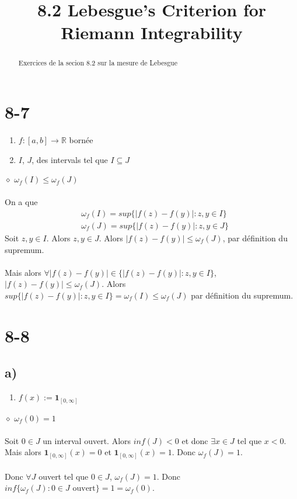 \documentclass[a4paper,10pt]{article}
\title{8.2 Lebesgue's Criterion for Riemann Integrability}
\begin{document}
\maketitle

\begin{abstract}
Exercices de la secion 8.2 sur la mesure de Lebesgue
\end{abstract}

\section*{8-7}
\begin{enumerate}
  \item $f : [a,b] \rightarrow \mathbb{R}$ bornée
  \item $I$, $J$, des intervals tel que $I \subseteq J$
\end{enumerate}
$\diamond$  $\omega_f (I) \leq \omega_f (J)$
\\
\\
On a que
\begin{align*}
  & \omega_f (I) = sup \{|f(z) - f(y)| : z,y \in I\} \\
  & \omega_f (J) = sup \{|f(z) - f(y)| : z,y \in J\}
\end{align*}
Soit $z,y \in I$. Alors $z,y \in J$. Alors $|f(z) - f(y)| \leq \omega_f (J)$, par définition du supremum.
\\
\\
Mais alors $\forall |f(z) - f(y)| \in \{|f(z) - f(y)| : z,y \in I\}$, $|f(z) - f(y)| \leq \omega_f (J)$. Alors 
$sup \{|f(z) - f(y)| : z,y \in I\} = \omega_f (I) \leq \omega_f (J)$ par définition du supremum.

\section*{8-8}
\subsection*{a)}
\begin{enumerate}
 \item $f(x) := \textbf{1}_{[0, \infty]}$
\end{enumerate}
$\diamond$ $\omega_f (0) = 1$
\\
\\
Soit $0 \in J$ un interval ouvert. Alors $inf(J) < 0$ et donc $\exists x \in J$ tel que $x < 0$. Mais alors 
$\textbf{1}_{[0, \infty]} (x) = 0$ et $\textbf{1}_{[0, \infty]} (x) = 1$. Donc $\omega_f (J) = 1$. 
\\
\\
Donc $\forall J$ ouvert tel que $0 \in J$, $\omega_f (J) = 1$. Donc $inf \{\omega_f (J) : 0 \in J \text{ ouvert} \} = 1 = \omega_f (0)$.
\end{document}
